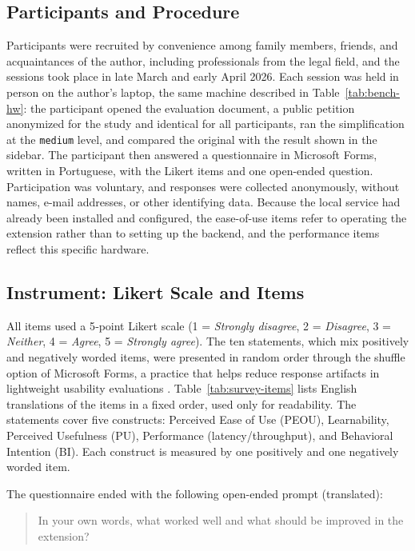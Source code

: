 \documentclass[english]{UNISINOSartigo} %
\begin{document}
\subsection{Participants and Procedure}
Participants were recruited by convenience among family members, friends, and acquaintances of the author, including professionals from the legal field, and the sessions took place in late March and early April 2026. Each session was held in person on the author's laptop, the same machine described in Table~\ref{tab:bench-hw}: the participant opened the evaluation document, a public petition anonymized for the study and identical for all participants, ran the simplification at the \texttt{medium} level, and compared the original with the result shown in the sidebar. The participant then answered a questionnaire in Microsoft Forms, written in Portuguese, with the Likert items and one open-ended question. Participation was voluntary, and responses were collected anonymously, without names, e-mail addresses, or other identifying data. Because the local service had already been installed and configured, the ease-of-use items refer to operating the extension rather than to setting up the backend, and the performance items reflect this specific hardware.

\subsection{Instrument: Likert Scale and Items}
All items used a 5‐point Likert scale (1 = \textit{Strongly disagree}, 2 = \textit{Disagree}, 3 = \textit{Neither}, 4 = \textit{Agree}, 5 = \textit{Strongly agree}). The ten statements, which mix positively and negatively worded items, were presented in random order through the shuffle option of Microsoft Forms, a practice that helps reduce response artifacts in lightweight usability evaluations \cite{robertson2020discount}. Table~\ref{tab:survey-items} lists English translations of the items in a fixed order, used only for readability. The statements cover five constructs: Perceived Ease of Use (PEOU), Learnability, Perceived Usefulness (PU), Performance (latency/throughput), and Behavioral Intention (BI). Each construct is measured by one positively and one negatively worded item.

The questionnaire ended with the following open-ended prompt (translated):
\begin{quote}
In your own words, what worked well and what should be improved in the extension?
\end{quote}
\end{document}

